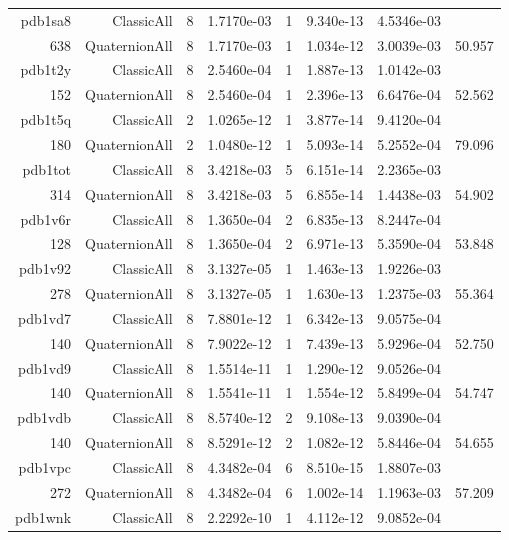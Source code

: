 \begin{xltabular}{\textwidth}{r|rcS[table-format=1.4e+2]cS[table-format=1.3e+2]S[table-format=1.4e+2]S[table-format=-1.3]}
pdb1sa8 & ClassicAll & 8 & 1.7170e-03 & 1 & 9.340e-13 & 4.5346e-03 & \\
638 & QuaternionAll & 8 & 1.7170e-03 & 1 & 1.034e-12 & 3.0039e-03 & 50.957\\  \addlinespace
pdb1t2y & ClassicAll & 8 & 2.5460e-04 & 1 & 1.887e-13 & 1.0142e-03 & \\
152 & QuaternionAll & 8 & 2.5460e-04 & 1 & 2.396e-13 & 6.6476e-04 & 52.562\\  \addlinespace
pdb1t5q & ClassicAll & 2 & 1.0265e-12 & 1 & 3.877e-14 & 9.4120e-04 & \\
180 & QuaternionAll & 2 & 1.0480e-12 & 1 & 5.093e-14 & 5.2552e-04 & 79.096\\  \addlinespace
pdb1tot & ClassicAll & 8 & 3.4218e-03 & 5 & 6.151e-14 & 2.2365e-03 & \\
314 & QuaternionAll & 8 & 3.4218e-03 & 5 & 6.855e-14 & 1.4438e-03 & 54.902\\  \addlinespace
pdb1v6r & ClassicAll & 8 & 1.3650e-04 & 2 & 6.835e-13 & 8.2447e-04 & \\
128 & QuaternionAll & 8 & 1.3650e-04 & 2 & 6.971e-13 & 5.3590e-04 & 53.848\\  \addlinespace
pdb1v92 & ClassicAll & 8 & 3.1327e-05 & 1 & 1.463e-13 & 1.9226e-03 & \\
278 & QuaternionAll & 8 & 3.1327e-05 & 1 & 1.630e-13 & 1.2375e-03 & 55.364\\  \addlinespace
pdb1vd7 & ClassicAll & 8 & 7.8801e-12 & 1 & 6.342e-13 & 9.0575e-04 & \\
140 & QuaternionAll & 8 & 7.9022e-12 & 1 & 7.439e-13 & 5.9296e-04 & 52.750\\  \addlinespace
pdb1vd9 & ClassicAll & 8 & 1.5514e-11 & 1 & 1.290e-12 & 9.0526e-04 & \\
140 & QuaternionAll & 8 & 1.5541e-11 & 1 & 1.554e-12 & 5.8499e-04 & 54.747\\  \addlinespace
pdb1vdb & ClassicAll & 8 & 8.5740e-12 & 2 & 9.108e-13 & 9.0390e-04 & \\
140 & QuaternionAll & 8 & 8.5291e-12 & 2 & 1.082e-12 & 5.8446e-04 & 54.655\\  \addlinespace
pdb1vpc & ClassicAll & 8 & 4.3482e-04 & 6 & 8.510e-15 & 1.8807e-03 & \\
272 & QuaternionAll & 8 & 4.3482e-04 & 6 & 1.002e-14 & 1.1963e-03 & 57.209\\  \addlinespace
pdb1wnk & ClassicAll & 8 & 2.2292e-10 & 1 & 4.112e-12 & 9.0852e-04 & \\

\end{xltabular}

